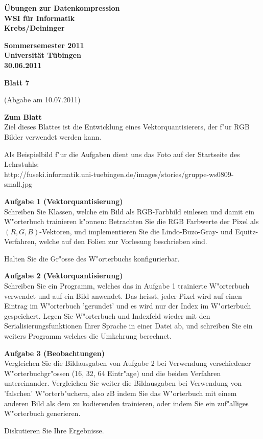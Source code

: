 \documentclass[a4paper]{article}
\def\header#1#2#3#4{\pagestyle{empty}
\noindent
\begin{minipage}[t]{0.6\textwidth}
\begin{flushleft}
\bf \"Ubungen zur Datenkompression\\
WSI f\"ur Informatik\\
Krebs/Deininger
\end{flushleft}
\end{minipage}
\begin{minipage}[t]{0.4\textwidth}
\begin{flushright}
\bf Sommersemester 2011\\
Universit\"at T\"ubingen\\
#2 %
\end{flushright}
\end{minipage}

\begin{center}
{\Large\bf Blatt #1}

{(Abgabe am #3)}
\end{center}
}
\begin{document}
\header{7}{30.06.2011}{10.07.2011}{}

\bigskip

{\bf Zum Blatt}\\
Ziel dieses Blattes ist die Entwicklung eines Vektorquantisierers, der f"ur RGB
Bilder verwendet werden kann.

Als Beispielbild f"ur die Aufgaben dient uns das Foto auf der Startseite des
Lehrstuhls:\\
http://fuseki.informatik.uni-tuebingen.de/images/stories/gruppe-ws0809-small.jpg

\bigskip

{\bf Aufgabe 1  \quad(Vektorquantisierung)}\\
Schreiben Sie Klassen, welche ein Bild als RGB-Farbbild einlesen und
damit ein W"orterbuch trainieren k"onnen:
Betrachten Sie die RGB Farbwerte der Pixel als $(R,G,B)$-Vektoren, und
implementieren Sie die Lindo-Buzo-Gray- und Equitz-Verfahren, welche auf den
Folien zur Vorlesung beschrieben sind.

Halten Sie die Gr"osse des W"orterbuchs konfigurierbar.

\bigskip

{\bf Aufgabe 2  \quad(Vektorquantisierung)}\\
Schreiben Sie ein Programm, welches das in Aufgabe 1 trainierte W"orterbuch
verwendet und auf ein Bild anwendet. Das heisst, jeder Pixel wird auf einen
Eintrag im W"orterbuch 'gerundet' und es wird nur der Index im W"orterbuch
gespeichert. Legen Sie W"orterbuch und Indexfeld wieder mit den
Serialisierungsfunktionen Ihrer Sprache in einer Datei ab, und schreiben Sie ein
weiters Programm welches die Umkehrung berechnet.

\bigskip

{\bf Aufgabe 3  \quad(Beobachtungen)}\\
Vergleichen Sie die Bildausgaben von Aufgabe 2 bei Verwendung verschiedener
W"orterbuchgr"ossen (16, 32, 64 Eintr"age) und die beiden Verfahren
untereinander. Vergleichen Sie weiter die Bildausgaben bei Verwendung von
'falschen' W"orterb"uchern, also zB indem Sie das W"orterbuch mit einem anderen
Bild als dem zu kodierenden trainieren, oder indem Sie ein zuf"alliges
W"orterbuch generieren.

Diskutieren Sie Ihre Ergebnisse.
\end{document}
